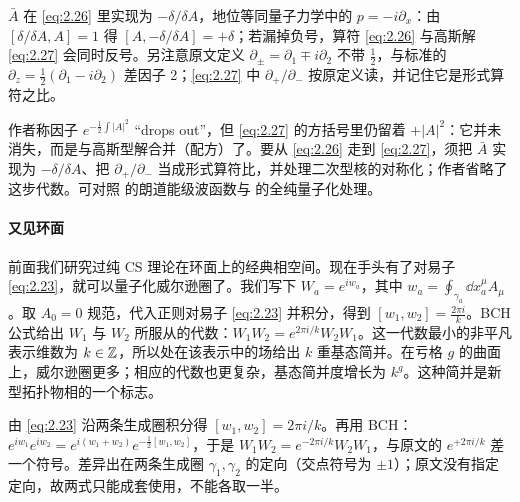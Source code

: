\begin{yizhu}[易错点]
$\bar A$ 在 \eqref{eq:2.26} 里实现为 $-\delta/\delta A$，地位等同量子力学中的 $p=-i\partial_x$：由 $[\delta/\delta A, A] = 1$ 得 $[A,-\delta/\delta A] = +\delta$；若漏掉负号，算符 \eqref{eq:2.26} 与高斯解 \eqref{eq:2.27} 会同时反号。另注意原文定义 $\partial_\pm = \partial_1\mp i\partial_2$ 不带 $\frac12$，与标准的 $\partial_z=\frac12(\partial_1-i\partial_2)$ 差因子 2；\eqref{eq:2.27} 中 $\partial_+/\partial_-$ 按原定义读，并记住它是形式算符之比。
\end{yizhu}

\begin{yizhu}[含糊点]
作者称因子 $e^{-\frac12\int|A|^2}$ “drops out”，但 \eqref{eq:2.27} 的方括号里仍留着 $+|A|^2$：它并未消失，而是与高斯型解合并（配方）了。要从 \eqref{eq:2.26} 走到 \eqref{eq:2.27}，须把 $\bar A$ 实现为 $-\delta/\delta A$、把 $\partial_+/\partial_-$ 当成形式算符比，并处理二次型核的对称化；作者省略了这步代数。可对照 \cite{dunne} 的朗道能级波函数与 \cite{woodhouse} 的全纯量子化处理。
\end{yizhu}

\paragraph{又见环面}前面我们研究过纯 CS 理论在环面上的经典相空间。现在手头有了对易子 \eqref{eq:2.23}，就可以量子化威尔逊圈了。我们写下 $W_a = e^{iw_a}$，其中 $w_a = \oint_{\gamma_a}\dd x^\mu_a A_\mu$。取 $A_0 = 0$ 规范，代入正则对易子 \eqref{eq:2.23} 并积分，得到 $[w_1,w_2] = \frac{2\pi i}{k}$。BCH 公式给出 $W_1$ 与 $W_2$ 所服从的代数：$W_1W_2 = e^{2\pi i/k}W_2W_1$。这一代数最小的非平凡表示维数为 $k\in\mathbb{Z}$，所以处在该表示中的场给出 $k$ 重基态简并。在亏格 $g$ 的曲面上，威尔逊圈更多；相应的代数也更复杂，基态简并度增长为 $k^g$。这种简并是新型拓扑物相的一个标志。

\begin{yizhu}[易错点]
由 \eqref{eq:2.23} 沿两条生成圈积分得 $[w_1,w_2]=2\pi i/k$。再用 BCH：$e^{iw_1}e^{iw_2}=e^{i(w_1+w_2)}e^{-\frac12[w_1,w_2]}$，于是 $W_1W_2=e^{-2\pi i/k}W_2W_1$，与原文的 $e^{+2\pi i/k}$ 差一个符号。差异出在两条生成圈 $\gamma_1,\gamma_2$ 的定向（交点符号为 $\pm1$）；原文没有指定定向，故两式只能成套使用，不能各取一半。
\end{yizhu}

